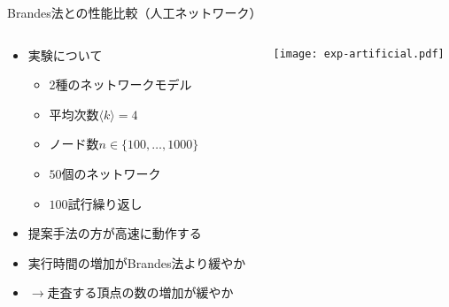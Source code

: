 \documentclass[dvipdfmx,fleqn]{beamer}
\begin{document}
\begin{frame}[allowframebreaks]{Brandes法との性能比較（人工ネットワーク）}
  \begin{columns}
    \begin{column}{.5\textwidth}
      \begin{itemize}
      \item 実験について
        \begin{itemize}
        \item 2種のネットワークモデル
        \item 平均次数$\langle k\rangle=4$
        \item ノード数$n\in\{100,\ldots,1000\}$
        \item $50$個のネットワーク
        \item $100$試行繰り返し
        \end{itemize}
        \medskip
      \item 提案手法の方が高速に動作する
      \item 実行時間の増加がBrandes法より緩やか
      \item[] $\rightarrow$\alert{走査する頂点の数の増加が緩やか}
      \end{itemize}
    \end{column}
    \begin{column}{.5\textwidth}
      \texttt{[image: exp-artificial.pdf]}
    \end{column}
  \end{columns}
\end{frame}
\end{document}
